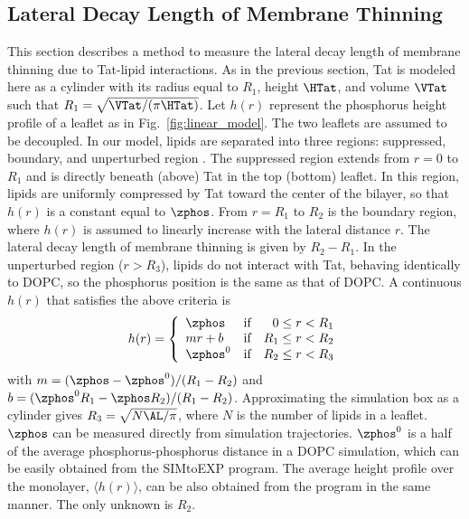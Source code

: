 \subsection{Lateral Decay Length of Membrane Thinning}\label{sec:lateral_decay}
This section describes a method to measure the lateral decay length
of membrane thinning due to Tat-lipid interactions. 
As in the previous section, Tat is modeled here as a cylinder with 
its radius equal to $R_1$, height $\HTat$,
and volume $\VTat$ such that $R_1=\sqrt{\VTat/(\pi \HTat)}$. 
Let $h(r)$ represent the phosphorus height profile
of a leaflet as in Fig.~\ref{fig:linear_model}. The two leaflets are assumed to be decoupled.
In our model, lipids are separated into three regions: 
suppressed, boundary, and unperturbed region . 
The suppressed region extends from $r=0$ to $R_1$ and is directly beneath 
(above) Tat in the top (bottom) leaflet. In this region, lipids are uniformly 
compressed by Tat toward the 
center of the bilayer, so that $h(r)$ is a constant equal to $\zphos$. 
From $r=R_1$ to $R_2$ is the boundary region, where $h(r)$ is assumed to 
linearly increase with the lateral distance $r$. The lateral decay length
of membrane thinning is given by $R_2-R_1$. 
In the unperturbed region ($r>R_3$), lipids do not interact with 
Tat, behaving identically to DOPC, so the phosphorus position is the same as that of 
DOPC. A continuous $h(r)$ that 
satisfies the above criteria is
\begin{equation}
  h(r) = \left\{ 
  \begin{array}{lcr}
    \zphos   & \text{if} & 0   \leq r < R_1 \\
    mr+b     & \text{if} & R_1 \leq r < R_2 \\
    \zphos^0 & \text{if} & R_2 \leq r < R_3 
  \end{array}\right.  
\end{equation}     
with $m=(\zphos-\zphos^0)/(R_1-R_2)$ and $b=(\zphos^0R_1-\zphos R_2)/(R_1-R_2)$. 
Approximating the simulation box as a cylinder gives 
$R_3=\sqrt{N\AL/\pi}$, where $N$ is the number of lipids in a leaflet. 
$\zphos$ can be measured directly from simulation trajectories.
$\zphos^0$ is a half of the average phosphorus-phosphorus distance 
in a DOPC simulation,
which can be easily obtained from the SIMtoEXP program. 
The average height profile over
the monolayer, $\langle h(r) \rangle$, can be also obtained from the program 
in the same manner. 
The only unknown is $R_2$.

